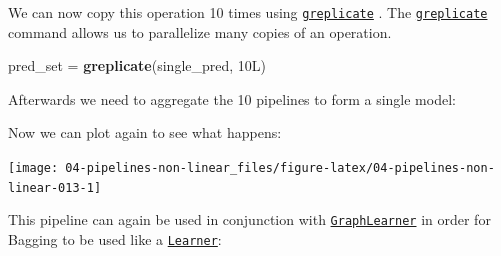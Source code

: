 \documentclass[]{scrbook}
\newenvironment{Shaded}{\begin{snugshade}}{\end{snugshade}}
\newcommand{\DataTypeTok}[1]{\textcolor[rgb]{0.13,0.29,0.53}{#1}}
\newcommand{\KeywordTok}[1]{\textcolor[rgb]{0.13,0.29,0.53}{\textbf{#1}}}
\newcommand{\NormalTok}[1]{#1}
\newcommand{\OperatorTok}[1]{\textcolor[rgb]{0.81,0.36,0.00}{\textbf{#1}}}
\newcommand{\OtherTok}[1]{\textcolor[rgb]{0.56,0.35,0.01}{#1}}
\newcommand{\StringTok}[1]{\textcolor[rgb]{0.31,0.60,0.02}{#1}}
\renewenvironment{Shaded} {\begin{snugshade}\small} {\end{snugshade}}
\begin{document}
We can now copy this operation 10 times using \href{https://mlr3pipelines.mlr-org.com/reference/greplicate.html}{\texttt{greplicate}} .
The \href{https://mlr3pipelines.mlr-org.com/reference/greplicate.html}{\texttt{greplicate}} command allows us to parallelize many copies of an operation.

\begin{Shaded}
\begin{Highlighting}[]
\NormalTok{pred_set =}\StringTok{ }\KeywordTok{greplicate}\NormalTok{(single_pred, 10L)}
\end{Highlighting}
\end{Shaded}

Afterwards we need to aggregate the 10 pipelines to form a single model:

\begin{Shaded}
\end{Shaded}

Now we can plot again to see what happens:

\begin{Shaded}
\end{Shaded}

\begin{center}\texttt{[image: 04-pipelines-non-linear\_files/figure-latex/04-pipelines-non-linear-013-1]} \end{center}

This pipeline can again be used in conjunction with \href{https://mlr3pipelines.mlr-org.com/reference/mlr_learners_graph.html}{\texttt{GraphLearner}} in order for Bagging to be used like a \href{https://mlr3.mlr-org.com/reference/Learner.html}{\texttt{Learner}}:

\begin{Shaded}
\end{Shaded}
\end{document}
